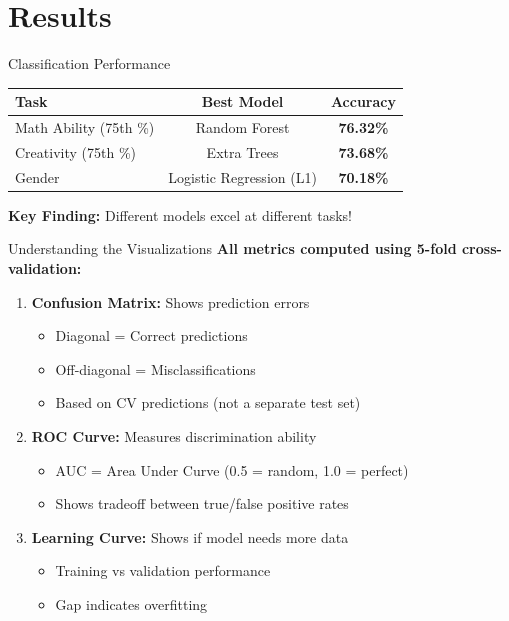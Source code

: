 \documentclass{beamer}
\begin{document}
\section{Results}

\begin{frame}{Classification Performance}
\begin{table}
\centering
\begin{tabular}{lcc}
\toprule
\textbf{Task} & \textbf{Best Model} & \textbf{Accuracy} \\
\midrule
Math Ability (75th \%) & Random Forest & \textbf{76.32\%} \\
Creativity (75th \%) & Extra Trees & \textbf{73.68\%} \\
Gender & Logistic Regression (L1) & \textbf{70.18\%} \\
\bottomrule
\end{tabular}
\end{table}

\vskip 0.5cm

\centering
\textbf{Key Finding:} Different models excel at different tasks!
\end{frame}

\begin{frame}{Understanding the Visualizations}
\textbf{All metrics computed using 5-fold cross-validation:}

\begin{enumerate}
  \item \textbf{Confusion Matrix:} Shows prediction errors
  \begin{itemize}
    \item Diagonal = Correct predictions
    \item Off-diagonal = Misclassifications
    \item Based on CV predictions (not a separate test set)
  \end{itemize}
  
  \vspace{0.2cm}
  
  \item \textbf{ROC Curve:} Measures discrimination ability
  \begin{itemize}
    \item AUC = Area Under Curve (0.5 = random, 1.0 = perfect)
    \item Shows tradeoff between true/false positive rates
  \end{itemize}
  
  \vspace{0.2cm}
  
  \item \textbf{Learning Curve:} Shows if model needs more data
  \begin{itemize}
    \item Training vs validation performance
    \item Gap indicates overfitting
  \end{itemize}
\end{enumerate}
\end{frame}
\end{document}
